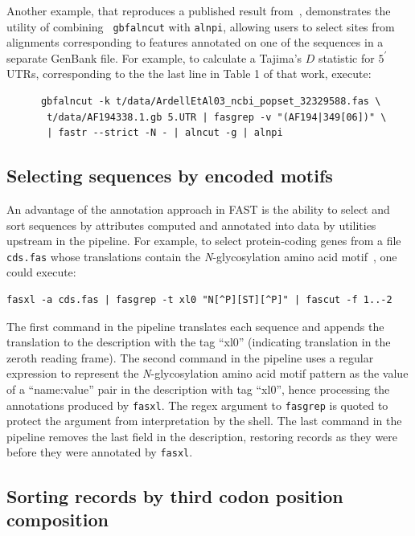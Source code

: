 \documentclass{frontiersSCNS} %
\newcommand{\fp}{$5^\prime${ }}
\begin{document}
Another example, that reproduces a published result
from~\citep{Ardell03}, demonstrates the utility of combining {\tt
  gbfalncut} with {\tt alnpi}, allowing users to select sites from
alignments corresponding to features annotated on one of the sequences
in a separate GenBank file. For example, to calculate a Tajima's $D$
statistic for \fp UTRs, corresponding to the the last line in Table 1
of that work, execute:

\begin{verbatim}
      gbfalncut -k t/data/ArdellEtAl03_ncbi_popset_32329588.fas \
       t/data/AF194338.1.gb 5.UTR | fasgrep -v "(AF194|349[06])" \
       | fastr --strict -N - | alncut -g | alnpi
\end{verbatim}

\subsection{Selecting sequences by encoded motifs }

An advantage of the annotation approach in FAST is the ability to
select and sort sequences by attributes computed and annotated into
data by utilities upstream in the pipeline. For example, to select
protein-coding genes from a file {\tt cds.fas} whose translations
contain the {\it N}-glycosylation amino acid
motif~\citep{KornfieldKornfield85}, one could execute:

\begin{verbatim}
fasxl -a cds.fas | fasgrep -t xl0 "N[^P][ST][^P]" | fascut -f 1..-2
\end{verbatim}
 
The first command in the pipeline translates each sequence and appends
the translation to the description with the tag ``xl0'' (indicating
translation in the zeroth reading frame). The second command in the
pipeline uses a regular expression to represent the {\it
  N}-glycosylation amino acid motif pattern as the value of a
``name:value'' pair in the description with tag ``xl0'', hence
processing the annotations produced by {\tt fasxl}. The regex argument
to {\tt fasgrep} is quoted to protect the argument from interpretation
by the shell. The last command in the pipeline removes the last field
in the description, restoring records as they were before they were
annotated by {\tt fasxl}.

\subsection{Sorting records by third codon position composition}
\end{document}
